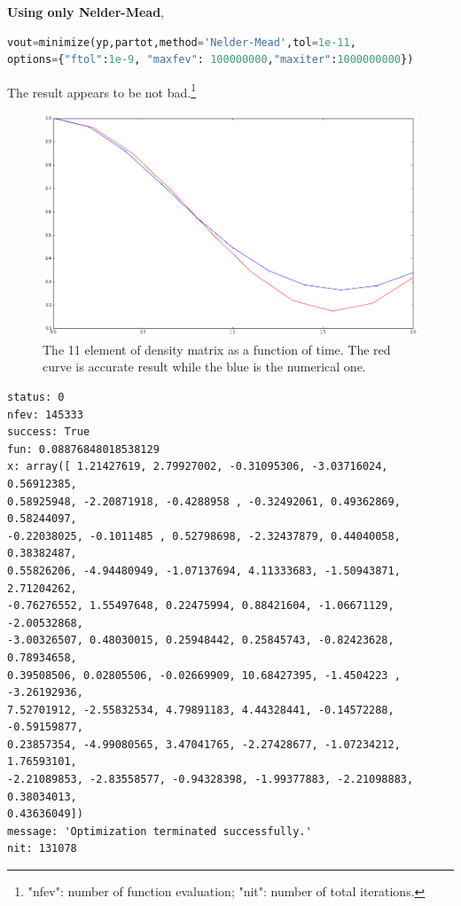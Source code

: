 \documentclass{tufte-handout}
\begin{document}
{\bf{Using only Nelder-Mead}},

\begin{lstlisting}[language=Python]
vout=minimize(yp,partot,method='Nelder-Mead',tol=1e-11, 
options={"ftol":1e-9, "maxfev": 100000000,"maxiter":1000000000})
\end{lstlisting}

The result appears to be not bad.\footnote{"nfev": number of function evaluation; "nit": number of total iterations.}

\begin{figure}
\includegraphics{assets/ann_NelderMead}
\caption{The 11 element of density matrix as a function of time. The red curve is accurate result while the blue is the numerical one.}
\label{fig:ann-NelderMead}
\end{figure}


\begin{verbatim}
status: 0 
nfev: 145333 
success: True 
fun: 0.08876848018538129 
x: array([ 1.21427619, 2.79927002, -0.31095306, -3.03716024, 0.56912385,
0.58925948, -2.20871918, -0.4288958 , -0.32492061, 0.49362869, 0.58244097,
-0.22038025, -0.1011485 , 0.52798698, -2.32437879, 0.44040058, 0.38382487,
0.55826206, -4.94480949, -1.07137694, 4.11333683, -1.50943871, 2.71204262,
-0.76276552, 1.55497648, 0.22475994, 0.88421604, -1.06671129, -2.00532868,
-3.00326507, 0.48030015, 0.25948442, 0.25845743, -0.82423628, 0.78934658,
0.39508506, 0.02805506, -0.02669909, 10.68427395, -1.4504223 , -3.26192936,
7.52701912, -2.55832534, 4.79891183, 4.44328441, -0.14572288, -0.59159877,
0.23857354, -4.99080565, 3.47041765, -2.27428677, -1.07234212, 1.76593101,
-2.21089853, -2.83558577, -0.94328398, -1.99377883, -2.21098883, 0.38034013,
0.43636049]) 
message: 'Optimization terminated successfully.' 
nit: 131078
\end{verbatim}
\end{document}
